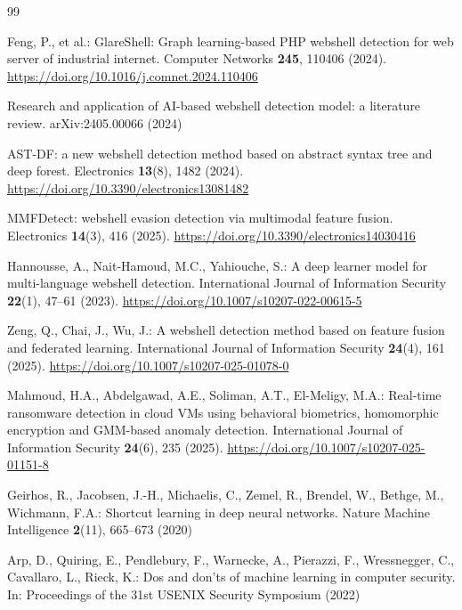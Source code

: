 \documentclass[pdflatex,sn-mathphys-num]{sn-jnl}
\begin{document}
\begin{thebibliography}{99}

Feng, P., et al.: GlareShell: Graph learning-based PHP webshell detection for
web server of industrial internet. Computer Networks \textbf{245}, 110406
(2024). \url{https://doi.org/10.1016/j.comnet.2024.110406}

Research and application of AI-based webshell detection model: a literature
review. arXiv:2405.00066 (2024)

AST-DF: a new webshell detection method based on abstract syntax tree and deep
forest. Electronics \textbf{13}(8), 1482 (2024).
\url{https://doi.org/10.3390/electronics13081482}

MMFDetect: webshell evasion detection via multimodal feature fusion.
Electronics \textbf{14}(3), 416 (2025).
\url{https://doi.org/10.3390/electronics14030416}

Hannousse, A., Nait-Hamoud, M.C., Yahiouche, S.: A deep learner model for
multi-language webshell detection. International Journal of Information
Security \textbf{22}(1), 47--61 (2023).
\url{https://doi.org/10.1007/s10207-022-00615-5}

Zeng, Q., Chai, J., Wu, J.: A webshell detection method based on feature fusion
and federated learning. International Journal of Information Security
\textbf{24}(4), 161 (2025). \url{https://doi.org/10.1007/s10207-025-01078-0}

Mahmoud, H.A., Abdelgawad, A.E., Soliman, A.T., El-Meligy, M.A.: Real-time
ransomware detection in cloud VMs using behavioral biometrics, homomorphic
encryption and GMM-based anomaly detection. International Journal of
Information Security \textbf{24}(6), 235 (2025).
\url{https://doi.org/10.1007/s10207-025-01151-8}

Geirhos, R., Jacobsen, J.-H., Michaelis, C., Zemel, R., Brendel, W., Bethge,
M., Wichmann, F.A.: Shortcut learning in deep neural networks. Nature Machine
Intelligence \textbf{2}(11), 665--673 (2020)

Arp, D., Quiring, E., Pendlebury, F., Warnecke, A., Pierazzi, F.,
Wressnegger, C., Cavallaro, L., Rieck, K.: Dos and don'ts of machine learning
in computer security. In: Proceedings of the 31st USENIX Security Symposium
(2022)


\end{thebibliography}
\end{document}
